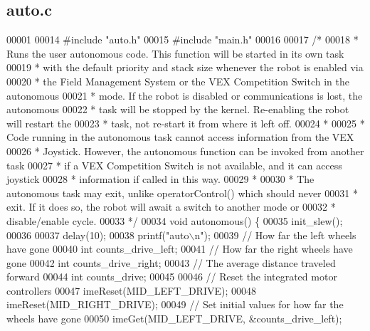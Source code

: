 \subsection{auto.\+c}
\label{a00080_source}

\begin{DoxyCode}
00001 
00014 \textcolor{preprocessor}{#include "auto.h"}
00015 \textcolor{preprocessor}{#include "main.h"}
00016 
00017 \textcolor{comment}{/*}
00018 \textcolor{comment}{ * Runs the user autonomous code. This function will be started in its own task}
00019 \textcolor{comment}{ * with the default priority and stack size whenever the robot is enabled via}
00020 \textcolor{comment}{ * the Field Management System or the VEX Competition Switch in the autonomous}
00021 \textcolor{comment}{ * mode. If the robot is disabled or communications is lost,  the autonomous}
00022 \textcolor{comment}{ * task will be stopped by the kernel. Re-enabling the robot will restart the}
00023 \textcolor{comment}{ * task, not re-start it from where it left off.}
00024 \textcolor{comment}{ *}
00025 \textcolor{comment}{ * Code running in the autonomous task cannot access information from the VEX}
00026 \textcolor{comment}{ * Joystick. However, the autonomous function can be invoked from another task}
00027 \textcolor{comment}{ * if a VEX Competition Switch is not available, and it can access joystick}
00028 \textcolor{comment}{ * information if called in this way.}
00029 \textcolor{comment}{ *}
00030 \textcolor{comment}{ * The autonomous task may exit, unlike operatorControl() which should never}
00031 \textcolor{comment}{ * exit. If it does so, the robot will await a switch to another mode or}
00032 \textcolor{comment}{ * disable/enable cycle.}
00033 \textcolor{comment}{ */}
00034 \textcolor{keywordtype}{void} autonomous() \{
00035   init_slew();
00036 
00037   delay(10);
00038   printf(\textcolor{stringliteral}{"auto\(\backslash\)n"});
00039   \textcolor{comment}{// How far the left wheels have gone}
00040   \textcolor{keywordtype}{int} counts\_drive\_left;
00041   \textcolor{comment}{// How far the right wheels have gone}
00042   \textcolor{keywordtype}{int} counts\_drive\_right;
00043   \textcolor{comment}{// The average distance traveled forward}
00044   \textcolor{keywordtype}{int} counts\_drive;
00045 
00046   \textcolor{comment}{// Reset the integrated motor controllers}
00047   imeReset(MID_LEFT_DRIVE);
00048   imeReset(MID_RIGHT_DRIVE);
00049   \textcolor{comment}{// Set initial values for how far the wheels have gone}
00050   imeGet(MID_LEFT_DRIVE, &counts\_drive\_left);

\end{DoxyCode}
